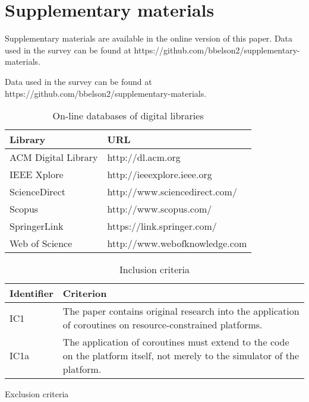 \appendix

\section{Supplementary materials}


\begin{printonly}
	Supplementary materials are available in the online version of this paper. Data used in the survey can be found at https://github.com/bbelson2/supplementary-materials.
	
\end{printonly}

\begin{screenonly}
Data used in the survey can be found at https://github.com/bbelson2/supplementary-materials.
	
\begin{table}[h]
	\caption{On-line databases of digital libraries}
	
	\begin{tabular}{l l}
		\hline
		Library	& URL \\
		\hline
		ACM Digital Library & http://dl.acm.org \\
		IEEE Xplore & http://ieeexplore.ieee.org \\
		ScienceDirect & http://www.sciencedirect.com/ \\
		Scopus & http://www.scopus.com/ \\
		SpringerLink & https://link.springer.com/ \\
		Web of Science & http://www.webofknowledge.com \\
		\hline
	\end{tabular}
\end{table}
	
\begin{table}[h]
	\caption{Inclusion criteria}
	
	\begin{tabular} {l p{10cm} }
		\hline
		Identifier & Criterion \\
		\hline
		IC1 & The paper contains original research into the application of coroutines on resource-constrained platforms.\\
		IC1a & The application of coroutines must extend to the code on the platform itself, not merely to the simulator of the platform.\\
		\hline
	\end{tabular}
\end{table}

\begin{table}[h]
	\caption{Exclusion criteria}
	

\end{table}
\end{screenonly}

